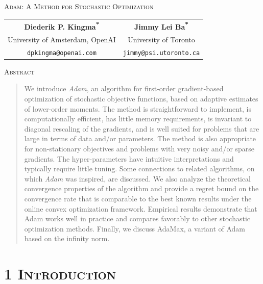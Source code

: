 \documentclass[11pt]{article}
\begin{document}
\begin{center}
{\Large\scshape Adam: A Method for Stochastic Optimization}\\[1.5em]
\begin{tabular}{cc}
\textbf{Diederik P. Kingma\textsuperscript{*}} & \textbf{Jimmy Lei Ba\textsuperscript{*}} \\
University of Amsterdam, OpenAI & University of Toronto \\
\texttt{dpkingma@openai.com} & \texttt{jimmy@psi.utoronto.ca}
\end{tabular}
\end{center}

\vspace{1em}

\begin{center}
{\scshape Abstract}
\end{center}
\begin{quote}
We introduce \emph{Adam}, an algorithm for first-order gradient-based
optimization of stochastic objective functions, based on adaptive
estimates of lower-order moments. The method is straightforward to
implement, is computationally efficient, has little memory
requirements, is invariant to diagonal rescaling of the gradients,
and is well suited for problems that are large in terms of data
and/or parameters. The method is also appropriate for non-stationary
objectives and problems with very noisy and/or sparse gradients. The
hyper-parameters have intuitive interpretations and typically require
little tuning. Some connections to related algorithms, on which
\emph{Adam} was inspired, are discussed. We also analyze the
theoretical convergence properties of the algorithm and provide a
regret bound on the convergence rate that is comparable to the best
known results under the online convex optimization framework.
Empirical results demonstrate that Adam works well in practice and
compares favorably to other stochastic optimization methods. Finally,
we discuss AdaMax, a variant of Adam based on the infinity norm.
\end{quote}

\vspace{1em}

\section*{1 \textsc{Introduction}}
\end{document}
